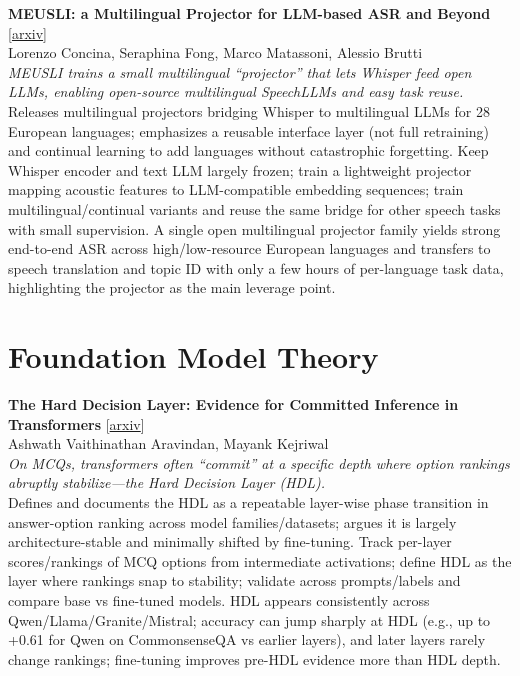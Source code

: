 \documentclass[12pt,letterpaper]{article}
\begin{document}
\medskip

{\small\textbf{MEUSLI: a Multilingual Projector for LLM-based ASR and Beyond}} {\scriptsize[\href{https://arxiv.org/abs/2607.22100}{arxiv}]}\\
{\scriptsize Lorenzo Concina, Seraphina Fong, Marco Matassoni, Alessio Brutti}\\

{\small\textit{MEUSLI trains a small multilingual ``projector'' that lets Whisper feed open LLMs, enabling open-source multilingual SpeechLLMs and easy task reuse.}}\\[1pt]
{\footnotesize Releases multilingual projectors bridging Whisper to multilingual LLMs for 28 European languages; emphasizes a reusable interface layer (not full retraining) and continual learning to add languages without catastrophic forgetting. Keep Whisper encoder and text LLM largely frozen; train a lightweight projector mapping acoustic features to LLM-compatible embedding sequences; train multilingual/continual variants and reuse the same bridge for other speech tasks with small supervision. A single open multilingual projector family yields strong end-to-end ASR across high/low-resource European languages and transfers to speech translation and topic ID with only a few hours of per-language task data, highlighting the projector as the main leverage point.}

\medskip


\section*{Foundation Model Theory}

{\small\textbf{The Hard Decision Layer: Evidence for Committed Inference in Transformers}} {\scriptsize[\href{https://arxiv.org/abs/2607.21613}{arxiv}]}\\
{\scriptsize Ashwath Vaithinathan Aravindan, Mayank Kejriwal}\\

{\small\textit{On MCQs, transformers often ``commit'' at a specific depth where option rankings abruptly stabilize---the Hard Decision Layer (HDL).}}\\[1pt]
{\footnotesize Defines and documents the HDL as a repeatable layer-wise phase transition in answer-option ranking across model families/datasets; argues it is largely architecture-stable and minimally shifted by fine-tuning. Track per-layer scores/rankings of MCQ options from intermediate activations; define HDL as the layer where rankings snap to stability; validate across prompts/labels and compare base vs fine-tuned models. HDL appears consistently across Qwen/Llama/Granite/Mistral; accuracy can jump sharply at HDL (e.g., up to +0.61 for Qwen on CommonsenseQA vs earlier layers), and later layers rarely change rankings; fine-tuning improves pre-HDL evidence more than HDL depth.}
\end{document}
